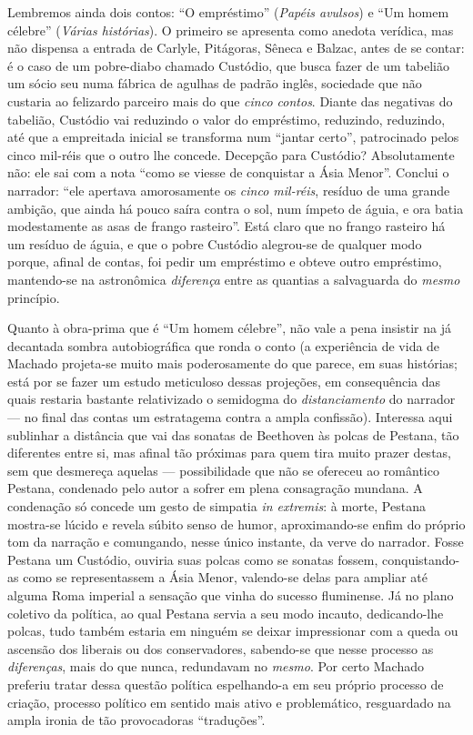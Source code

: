 Lembremos ainda dois contos: ``O empréstimo'' (\emph{Papéis avulsos}) e
``Um homem célebre'' (\emph{Várias histórias}). O primeiro se apresenta
como anedota verídica, mas não dispensa a entrada de Carlyle, Pitágoras,
Sêneca e Balzac, antes de se contar: é o caso de um pobre-diabo chamado
Custódio, que busca fazer de um tabelião um sócio seu numa fábrica de
agulhas de padrão inglês, sociedade que não custaria ao felizardo
parceiro mais do que \emph{cinco contos}. Diante das negativas do
tabelião, Custódio vai reduzindo o valor do empréstimo, reduzindo,
reduzindo, até que a empreitada inicial se transforma num ``jantar
certo'', patrocinado pelos cinco mil-réis que o outro lhe concede.
Decepção para Custódio? Absolutamente não: ele sai com a nota ``como se
viesse de conquistar a Ásia Menor''. Conclui o narrador: ``ele apertava
amorosamente os \emph{cinco mil-réis}, resíduo de uma grande ambição,
que ainda há pouco saíra contra o sol, num ímpeto de águia, e ora batia
modestamente as asas de frango rasteiro''. Está claro que no frango
rasteiro há um resíduo de águia, e que o pobre Custódio alegrou-se de
qualquer modo porque, afinal de contas, foi pedir um empréstimo e obteve
outro empréstimo, mantendo-se na astronômica \emph{diferença} entre as
quantias a salvaguarda do \emph{mesmo} princípio.

Quanto à obra-prima que é ``Um homem célebre'', não vale a pena insistir
na já decantada sombra autobiográfica que ronda o conto (a experiência
de vida de Machado projeta-se muito mais poderosamente do que parece, em
suas histórias; está por se fazer um estudo meticuloso dessas projeções,
em consequência das quais restaria bastante relativizado o semidogma do
\emph{distanciamento} do narrador --- no final das contas um estratagema
contra a ampla confissão). Interessa aqui sublinhar a distância que vai
das sonatas de Beethoven às polcas de Pestana, tão diferentes entre si,
mas afinal tão próximas para quem tira muito prazer destas, sem que
desmereça aquelas --- possibilidade que não se ofereceu ao romântico
Pestana, condenado pelo autor a sofrer em plena consagração mundana. A
condenação só concede um gesto de simpatia \emph{in extremis}: à morte,
Pestana mostra-se lúcido e revela súbito senso de humor, aproximando-se
enfim do próprio tom da narração e comungando, nesse único instante, da
verve do narrador. Fosse Pestana um Custódio, ouviria suas polcas como
se sonatas fossem, conquistando-as como se representassem a Ásia Menor,
valendo-se delas para ampliar até alguma Roma imperial a sensação que
vinha do sucesso fluminense. Já no plano coletivo da política, ao qual
Pestana servia a seu modo incauto, dedicando-lhe polcas, tudo também
estaria em ninguém se deixar impressionar com a queda ou ascensão dos
liberais ou dos conservadores, sabendo-se que nesse processo as
\emph{diferenças}, mais do que nunca, redundavam no \emph{mesmo}. Por
certo Machado preferiu tratar dessa questão política espelhando-a em seu
próprio processo de criação, processo político em sentido mais ativo e
problemático, resguardado na ampla ironia de tão provocadoras
``traduções''.


